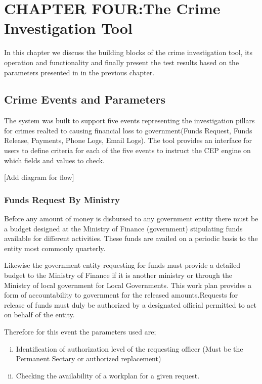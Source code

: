 
\section{CHAPTER FOUR:The Crime Investigation Tool}

\noindent In this chapter we discuss the building blocks of the crime investigation tool, its operation and functionality and finally present the test results based on the parameters presented in in the previous chapter.


\subsection{Crime Events and Parameters}

\noindent The system was built to support five events representing the investigation pillars for crimes realted to causing financial loss to government(Funds Request, Funds Release, Payments, Phone Logs, Email Logs). The tool provides an interface for users to define criteria for each of the five events to instruct the CEP engine on which fields and values to check.

[Add diagram for flow]

\subsubsection{Funds Request By Ministry}

\noindent Before any amount of money is disbursed to any government entity there must be a budget designed at the Ministry of Finance (government) stipulating funds available for different activities. These funds are availed on a periodic basis to the entity most commonly quarterly.

\noindent Likewise the government entity requesting for funds must provide a detailed budget to the Ministry of Finance if it is another ministry or through the Ministry of local government for Local Governments. This work plan provides a form of accountability to government for the released amounts.Requests for release of funds must duly be authorized by a designated official permitted to act on behalf of the entity.

\noindent Therefore for this event the parameters used are;

\begin{enumerate}[(i)]
\item Identification of authorization level of the requesting officer (Must be the Permanent Sectary or authorized replacement)
\item Checking the availability of a workplan for a given request. 
\end{enumerate}

